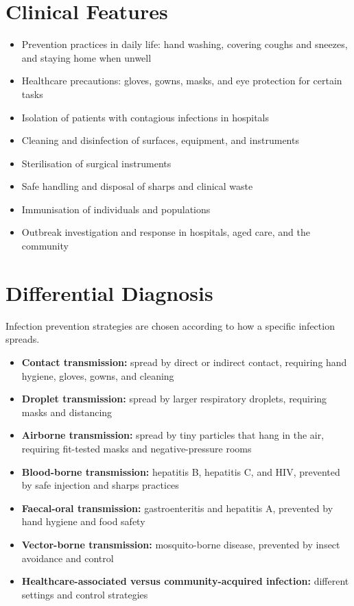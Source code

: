 \section*{Clinical Features}
\begin{itemize}
    \item Prevention practices in daily life: hand washing, covering coughs and sneezes, and staying home when unwell
    \item Healthcare precautions: gloves, gowns, masks, and eye protection for certain tasks
    \item Isolation of patients with contagious infections in hospitals
    \item Cleaning and disinfection of surfaces, equipment, and instruments
    \item Sterilisation of surgical instruments
    \item Safe handling and disposal of sharps and clinical waste
    \item Immunisation of individuals and populations
    \item Outbreak investigation and response in hospitals, aged care, and the community
\end{itemize}

\section*{Differential Diagnosis}
Infection prevention strategies are chosen according to how a specific infection spreads.
\begin{itemize}
    \item \textbf{Contact transmission:} spread by direct or indirect contact, requiring hand hygiene, gloves, gowns, and cleaning
    \item \textbf{Droplet transmission:} spread by larger respiratory droplets, requiring masks and distancing
    \item \textbf{Airborne transmission:} spread by tiny particles that hang in the air, requiring fit-tested masks and negative-pressure rooms
    \item \textbf{Blood-borne transmission:} hepatitis B, hepatitis C, and HIV, prevented by safe injection and sharps practices
    \item \textbf{Faecal-oral transmission:} gastroenteritis and hepatitis A, prevented by hand hygiene and food safety
    \item \textbf{Vector-borne transmission:} mosquito-borne disease, prevented by insect avoidance and control
    \item \textbf{Healthcare-associated versus community-acquired infection:} different settings and control strategies
\end{itemize}

